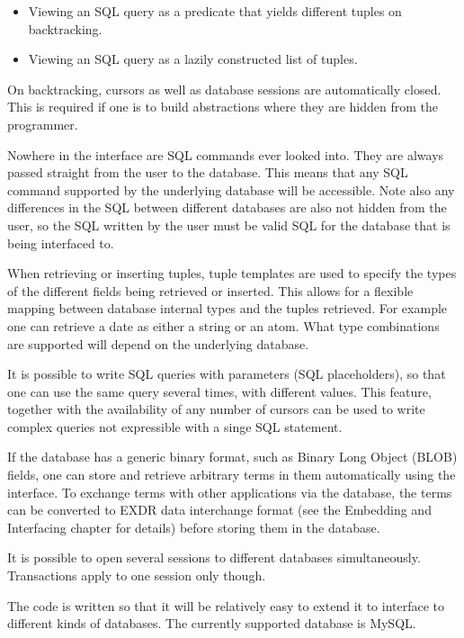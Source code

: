 \begin{itemize}
\item Viewing an SQL query as a predicate that yields
different tuples on backtracking.
\item Viewing an SQL query as a lazily constructed list of tuples.
\end{itemize}

On backtracking, cursors as well as database sessions are automatically
closed. This is required  if one is to build abstractions where they
are hidden from the programmer.

Nowhere in the interface are SQL commands ever looked
into. They are always passed straight from the user to the database.
This means that any SQL command supported by the underlying database will
be accessible. Note also any differences in the SQL between different databases
are also not hidden from the user, so the SQL written by the user must be
valid SQL for the database that is being interfaced to.

When retrieving or inserting tuples, tuple templates are used to
specify the types of the different fields being retrieved or
inserted. This allows for a flexible mapping between database
internal types and the tuples retrieved. For example one can
retrieve a date as either a string or an atom. What type combinations
are supported will depend on the underlying database.

It is possible to write SQL queries with parameters (SQL placeholders),
so that one can use the same query several times, with different
values. This feature, together with the availability of any number
of cursors can be used to write complex queries not
expressible with a singe SQL statement.
 
If the database has a generic binary format, such as Binary Long Object
(BLOB) fields, one can
store and retrieve arbitrary terms in them automatically using the
interface. To exchange
{\eclipse\/} terms with other applications via the database, the terms can
be converted to EXDR data interchange format (see the Embedding and
Interfacing chapter for details) before storing them in the database.

It is possible to open several sessions to different databases
simultaneously. Transactions apply to one session only though.

The code is written so that it will be relatively easy to extend it to
interface to different kinds of databases. The currently supported database is
MySQL.

